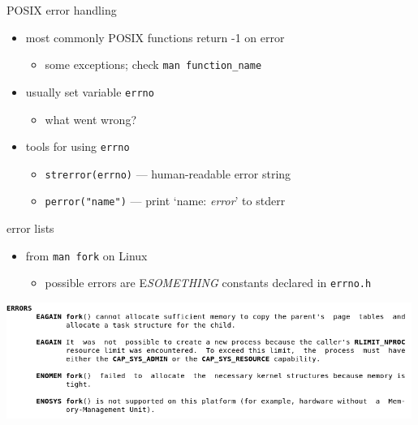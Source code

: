 \begin{frame}{POSIX error handling}
\begin{itemize}
\item most commonly POSIX functions return -1 on error
    \begin{itemize}
    \item some exceptions; check \texttt{man function\_name}
    \end{itemize}
\item usually set variable \texttt{errno}
    \begin{itemize}
    \item what went wrong?
    \end{itemize}
\item tools for using \texttt{errno}
    \begin{itemize}
    \item \texttt{strerror(errno)} --- human-readable error string
    \item \texttt{perror("name")} --- print `name: \textit{error}' to stderr
    \end{itemize}
\end{itemize}
\end{frame}

\begin{frame}{error lists}
\begin{itemize}
\item from \texttt{man fork} on Linux
    \begin{itemize}
    \item possible errors are E\textit{SOMETHING} constants declared in \texttt{errno.h}
    \end{itemize}
\end{itemize}
\includegraphics[width=0.99\textwidth]{../unix-api/fork-errors}
\end{frame}
